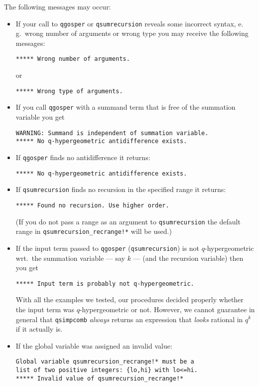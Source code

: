 The following messages may occur:
\begin{itemize}[left=1mm]
%
	\item If your call to \texttt{qgosper} or \texttt{qsumrecursion}
		reveals some incorrect syntax, e.\,g.\ wrong number of
		arguments or wrong type you may receive the following messages:
		\begin{verbatim}***** Wrong number of arguments.\end{verbatim}
		or
		\begin{verbatim}***** Wrong type of arguments.\end{verbatim}
%
	\item If you call \texttt{qgosper} with a summand term that
		is free of the summation variable you get
\begin{verbatim}
WARNING: Summand is independent of summation variable.
***** No q-hypergeometric antidifference exists.
\end{verbatim}
%
%
	\item If \texttt{qgosper} finds no antidifference it returns:
\begin{verbatim}
***** No q-hypergeometric antidifference exists.
\end{verbatim}
%
	\item If \texttt{qsumrecursion} finds no recursion in the specified
		range it returns:
		\begin{verbatim}***** Found no recursion. Use higher order.\end{verbatim}
		(If you do not pass a range as an argument to \texttt{qsumrecursion}
		the default range in \texttt{qsumrecursion\_recrange!*} will be used.)
%
	\item If the input term passed to \texttt{qgosper}
		(\texttt{qsumrecursion}) is not $q$-hyper\-geometric wrt.\ the
		summation variable --- say $k$ --- (and the recursion variable)
		then you get
\begin{verbatim}
***** Input term is probably not q-hypergeometric.
\end{verbatim}
		With all the examples we tested, our procedures decided properly
		whether the input term was $q$-hypergeometric or not. However, we
		cannot guarantee in general that \texttt{qsimpcomb} \emph{always} returns
		an expression that \emph{looks} rational in $q^k$ if it actually is.
%
	\item If the global variable  was
		assigned an invalid value:
\begin{verbatim}
Global variable qsumrecursion_recrange!* must be a
list of two positive integers: {lo,hi} with lo<=hi.
***** Invalid value of qsumrecursion_recrange!*
\end{verbatim}
%
\end{itemize}
